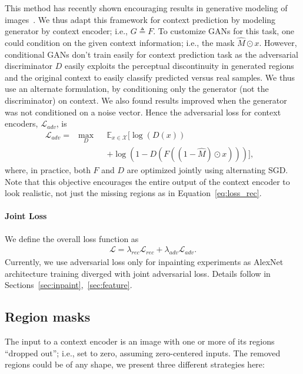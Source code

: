 \documentclass[10pt,twocolumn,letterpaper]{article}
\newcommand{\refeq}[1]{Equation~\eqref{eq:#1}}
\newcommand{\lbleq}[1]{\label{eq:#1}}
\begin{document}
This method has recently shown encouraging results in generative modeling of images~\cite{dcgan}.
We thus adapt this framework for context prediction by modeling generator by context encoder; i.e., $G \triangleq F$.
To customize GANs for this task, one could condition on the given context information; i.e., the mask $\hat{M} \odot x$.
However, conditional GANs don't train easily for context prediction task as the adversarial discriminator $D$ easily exploits the perceptual discontinuity in generated regions and the original context to easily classify predicted versus real samples.
We thus use an alternate formulation, by conditioning only the generator (not the discriminator) on context.
We also found results improved when the generator was not conditioned on a noise vector.
%
%
%
%
%
Hence the adversarial loss for context encoders, $\mathcal{L}_{adv}$, is
\begin{align}
\mathcal{L}_{adv} = & \max_{D} & & \mathbb{E}_{x\in \mathcal{X}}\lbrack\log (D(x)) & \nonumber\\
& & & + \log (1-D(F((1-\hat{M})\odot x)))\rbrack, & \lbleq{loss_adv}
\end{align}
where, in practice, both $F$ and $D$ are optimized jointly using alternating SGD.
Note that this objective encourages the entire output of the context encoder to look realistic, not just the missing regions as in \refeq{loss_rec}.

\paragraph{Joint Loss}
%
We define the overall loss function as
\begin{align}
\mathcal{L} = \lambda_{rec}\mathcal{L}_{rec} + \lambda_{adv}\mathcal{L}_{adv} \lbleq{loss}.
\end{align}
Currently, we use adversarial loss only for inpainting experiments as AlexNet~\cite{krizhevsky2012imagenet} architecture training diverged with joint adversarial loss.
Details follow in Sections~\ref{sec:inpaint},~\ref{sec:feature}.

%
%
%
%

%
%
%
%

%
%
%
%

%

\subsection{Region masks}
\label{sec:regdrop}
The input to a context encoder is an image with one or more of its regions ``dropped out''; i.e., set to zero, assuming zero-centered inputs.
The removed regions could be of any shape, we present three different strategies here:
\end{document}

